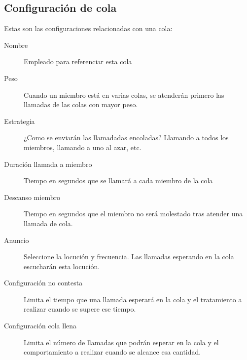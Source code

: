 \documentclass[letterpaper,10pt,spanish]{sphinxmanual}
\begin{document}
\subsection{Configuración de cola}
\label{pbx_features/queues:queue-configuration}
Estas son las configuraciones relacionadas con una cola:
\begin{description}
\item[{Nombre}] \leavevmode{}\label{pbx_features/queues:term-name}
Empleado para referenciar esta cola

\item[{Peso}] \leavevmode{}\label{pbx_features/queues:term-weight}
Cuando un miembro está en varias colas, se atenderán primero las llamadas de las colas con mayor peso.

\item[{Estrategia}] \leavevmode{}\label{pbx_features/queues:term-strategy}
¿Como se enviarán las llamadadas encoladas? Llamando a todos los miembros, llamando a uno al azar, etc.

\item[{Duración llamada a miembro}] \leavevmode{}\label{pbx_features/queues:term-member-call-seconds}
Tiempo en segundos que se llamará a cada miembro de la cola

\item[{Descanso miembro}] \leavevmode{}\label{pbx_features/queues:term-member-rest-seconds}
Tiempo en segundos que el miembro no será molestado tras atender una llamada de cola.

\item[{Anuncio}] \leavevmode{}\label{pbx_features/queues:term-announce}
Seleccione la locución y frecuencia. Las llamadas esperando en la cola escucharán esta locución.

\item[{Configuración no contesta}] \leavevmode{}\label{pbx_features/queues:term-timeout-configuration}
Limita el tiempo que una llamada esperará en la cola y el tratamiento a realizar cuando se supere ese tiempo.

\item[{Configuración cola llena}] \leavevmode{}\label{pbx_features/queues:term-full-queue-configuration}
Limita el número de llamadas que podrán esperar en la cola y el comportamiento a realizar cuando se alcance esa cantidad.

\end{description}
\end{document}
